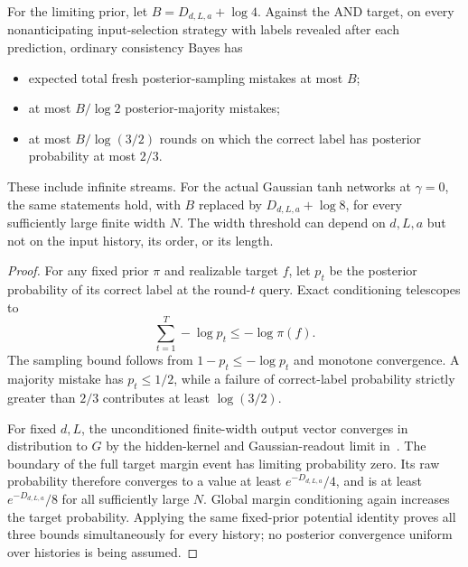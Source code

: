 \begin{corollary}
\label{gpupper:online}
For the limiting prior, let $B=D_{d,L,a}+\log4$. Against the AND target,
on every nonanticipating input-selection strategy with labels revealed
after each prediction, ordinary consistency Bayes has
\begin{itemize}
\item expected total fresh posterior-sampling mistakes at most $B$;
\item at most $B/\log2$ posterior-majority mistakes;
\item at most $B/\log(3/2)$ rounds on which the correct label has
posterior probability at most $2/3$.
\end{itemize}
These include infinite streams. For the actual Gaussian tanh networks
at $\gamma=0$, the same statements hold, with $B$ replaced by
$D_{d,L,a}+\log8$, for every sufficiently large finite width $N$.
The width threshold can depend on $d,L,a$ but not on the input history,
its order, or its length.
\end{corollary}

\begin{proof}
For any fixed prior $\pi$ and realizable target $f$, let $p_t$ be the
posterior probability of its correct label at the round-$t$ query.
Exact conditioning telescopes to
\[
 \sum_{t=1}^T-\log p_t\le-\log\pi(f).
\]
The sampling bound follows from $1-p_t\le-\log p_t$ and monotone
convergence. A majority mistake has $p_t\le1/2$, while a failure of
correct-label probability strictly greater than $2/3$ contributes at
least $\log(3/2)$.

For fixed $d,L$, the unconditioned finite-width output vector converges
in distribution to $G$ by the hidden-kernel and Gaussian-readout limit
in~\cite{nn-subcritical}. The boundary of the full target margin event
has limiting probability zero. Its raw probability therefore converges
to a value at least $e^{-D_{d,L,a}}/4$, and is at least
$e^{-D_{d,L,a}}/8$ for all sufficiently large $N$. Global margin
conditioning again increases the target probability. Applying the same
fixed-prior potential identity proves all three bounds simultaneously
for every history; no posterior convergence uniform over histories is
being assumed.
\end{proof}

